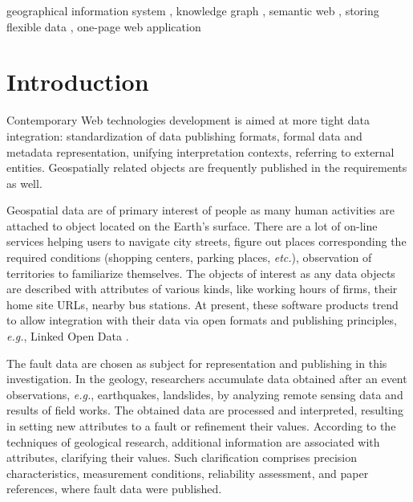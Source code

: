 \documentclass[
]{ceurart}
\begin{document}
\begin{keywords}
  geographical information system \sep
  knowledge graph \sep
  semantic web \sep
  storing flexible data \sep
  one-page web application
\end{keywords}

\maketitle

\section{Introduction}

Contemporary Web technologies development is aimed at more tight data integration: standardization of data publishing formats, formal data and metadata representation, unifying interpretation contexts, referring to external entities.  Geospatially related objects are frequently published in the requirements as well.

Geospatial data are of primary interest of people as many human activities are attached to object located on the Earth's surface.  There are a lot of on-line services helping users to navigate city streets, figure out places corresponding the required conditions (shopping centers, parking places, \emph{etc.}), observation of territories to familiarize themselves.  The objects of interest as any data objects are described with attributes of various kinds, like working hours of firms, their home site URLs, nearby bus stations.  At present, these software products trend to allow integration with their data via open formats and publishing principles, \emph{e.g.}, Linked Open Data \cite{lod}.

The fault data \cite{lunina} are chosen as subject for representation and publishing in this investigation.  In the geology, researchers accumulate data obtained after an event observations, \emph{e.g.}, earthquakes, landslides, by analyzing remote sensing data and results of field works.  The obtained data are processed and interpreted, resulting in setting new attributes to a fault or refinement their values.  According to the techniques of geological research, additional information are associated with attributes, clarifying their values.  Such clarification comprises precision characteristics, measurement conditions, reliability assessment, and paper references, where fault data were published.
\end{document}
